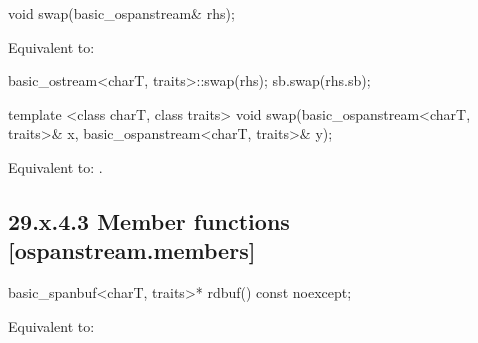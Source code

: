 \documentclass[ebook,11pt,article]{memoir}
\begin{document}
%

\begin{itemdecl}
void swap(basic_ospanstream& rhs);
\end{itemdecl}

\begin{itemdescr}
\pnum
\effects Equivalent to:
\begin{codeblock}
    basic_ostream<charT, traits>::swap(rhs);
    sb.swap(rhs.sb);
\end{codeblock}
\end{itemdescr}


\begin{itemdecl}
template <class charT, class traits>
  void swap(basic_ospanstream<charT, traits>& x,
            basic_ospanstream<charT, traits>& y);
\end{itemdecl}

\begin{itemdescr}
\pnum
\effects Equivalent to: .
\end{itemdescr}

\subsection{29.x.4.3 Member functions [ospanstream.members]}
\label{ospanstream.members}

\begin{itemdecl}
basic_spanbuf<charT, traits>* rdbuf() const noexcept;
\end{itemdecl}

\begin{itemdescr}
\pnum
\effects Equivalent to: \\
\end{itemdescr}
\end{document}
